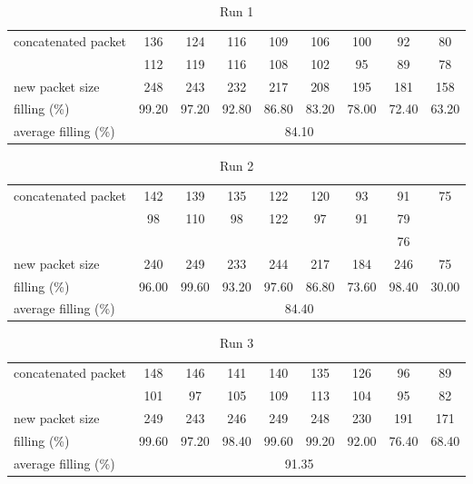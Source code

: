 \begin{table}[H]
	\begin{tabular}{|l||c|c|c|c|c|c|c|c|}
	\hline
	\multirow{2}{*}{concatenated packet} & 136 & 124 & 116 & 109 & 106 & 100 & 92 & 80 \\
	& 112 & 119 & 116 & 108 & 102 & 95 & 89 & 78 \\ \hline
	new packet size & 248 & 243 & 232 & 217 & 208 & 195 & 181 & 158 \\ \hline
	filling	(\%) & 99.20 & 97.20 & 92.80 & 86.80 & 83.20 & 78.00 & 72.40 & 63.20 \\ \hline
	average filling	(\%) & \multicolumn{8}{c|}{84.10} \\ \hline
	\end{tabular}
	\caption{Run 1}
	\label{table:run1}
\end{table}

\begin{table}[H]
	\begin{tabular}{|l||c|c|c|c|c|c|c|c|}
	\hline
	\multirow{3}{*}{concatenated packet} & 142 & 139 & 135 & 122 & 120 & 93 & 91 & 75 \\
	& 98 & 110 & 98 & 122 & 97 & 91 & 79 & \\
	& & & & & & & 76 & \\ \hline
	new packet size & 240 & 249 & 233 & 244 & 217 & 184 & 246 & 75 \\ \hline
	filling	(\%) & 96.00 & 99.60 & 93.20 & 97.60 & 86.80 & 73.60 & 98.40 & 30.00 \\ \hline
	average filling	(\%) & \multicolumn{8}{c|}{84.40} \\ \hline
	\end{tabular}
	\caption{Run 2}
	\label{table:run2}
\end{table}

\begin{table}[H]
	\begin{tabular}{|l||c|c|c|c|c|c|c|c|}
	\hline
	\multirow{2}{*}{concatenated packet} & 148 & 146 & 141 & 140 & 135 & 126 & 96 & 89 \\
	& 101 & 97 & 105 & 109 & 113 & 104 & 95 & 82\\ \hline
	new packet size & 249 & 243 & 246 & 249 & 248 & 230 & 191 & 171 \\ \hline
	filling	(\%) & 99.60 & 97.20 & 98.40 & 99.60 & 99.20 & 92.00 & 76.40 & 68.40 \\ \hline
	average filling	(\%) & \multicolumn{8}{c|}{91.35} \\ \hline
	\end{tabular}
	\caption{Run 3}
	\label{table:run3}
\end{table}


